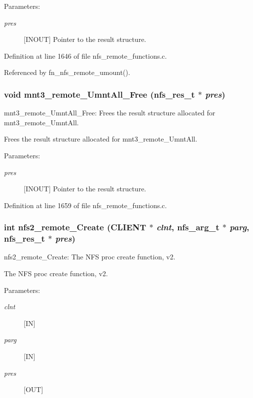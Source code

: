 \begin{Desc}
\item[Parameters:]
\begin{description}
\item[{\em pres}][INOUT] Pointer to the result structure. \end{description}
\end{Desc}


Definition at line 1646 of file nfs\_\-remote\_\-functions.c.

Referenced by fn\_\-nfs\_\-remote\_\-umount().
\subsubsection{\setlength{\rightskip}{0pt plus 5cm}void mnt3\_\-remote\_\-Umnt\-All\_\-Free (nfs\_\-res\_\-t $\ast$ {\em pres})}\label{group__NFSprocs_ga53}


mnt3\_\-remote\_\-Umnt\-All\_\-Free: Frees the result structure allocated for mnt3\_\-remote\_\-Umnt\-All.

Frees the result structure allocated for mnt3\_\-remote\_\-Umnt\-All.

\begin{Desc}
\item[Parameters:]
\begin{description}
\item[{\em pres}][INOUT] Pointer to the result structure. \end{description}
\end{Desc}


Definition at line 1659 of file nfs\_\-remote\_\-functions.c.
\subsubsection{\setlength{\rightskip}{0pt plus 5cm}int nfs2\_\-remote\_\-Create (CLIENT $\ast$ {\em clnt}, nfs\_\-arg\_\-t $\ast$ {\em parg}, nfs\_\-res\_\-t $\ast$ {\em pres})}\label{group__NFSprocs_ga9}


nfs2\_\-remote\_\-Create: The NFS proc create function, v2.

The NFS proc create function, v2.

\begin{Desc}
\item[Parameters:]
\begin{description}
\item[{\em clnt}][IN] \item[{\em parg}][IN] \item[{\em pres}][OUT] \end{description}
\end{Desc}


